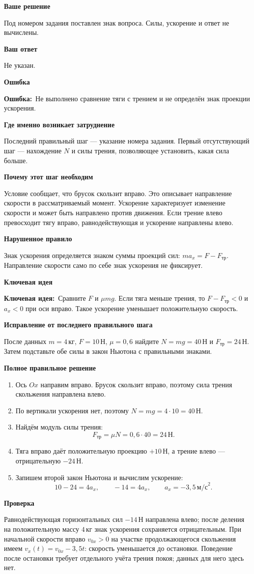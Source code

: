 \documentclass[a4paper,12pt]{article}
\newcommand{\subblock}[1]{\par\medskip\textbf{\color{deepaccent}#1}\par\vspace{-2pt}}
\newcommand{\errorlabel}{\textcolor{errorred}{\textbf{Ошибка:}}}
\newcommand{\keyidea}{\textcolor{ideablue}{\textbf{Ключевая идея:}}}
\begin{document}
\subblock{Ваше решение}
Под номером задания поставлен знак вопроса. Силы, ускорение и ответ не вычислены.

\subblock{Ваш ответ}
Не указан.

\subblock{Ошибка}
\errorlabel\ Не выполнено сравнение тяги с трением и не определён знак проекции ускорения.

\subblock{Где именно возникает затруднение}
Последний правильный шаг --- указание номера задания. Первый отсутствующий шаг --- нахождение $N$ и силы трения, позволяющее установить, какая сила больше.

\subblock{Почему этот шаг необходим}
Условие сообщает, что брусок скользит вправо. Это описывает направление скорости в рассматриваемый момент. Ускорение характеризует изменение скорости и может быть направлено против движения. Если трение влево превосходит тягу вправо, равнодействующая и ускорение направлены влево.

\subblock{Нарушенное правило}
Знак ускорения определяется знаком суммы проекций сил: $ma_x=F-F_{\text{тр}}$. Направление скорости само по себе знак ускорения не фиксирует.

\subblock{Ключевая идея}
\keyidea\ Сравните $F$ и $\mu mg$. Если тяга меньше трения, то $F-F_{\text{тр}}<0$ и $a_x<0$ при оси вправо. Такое ускорение уменьшает положительную скорость.

\subblock{Исправление от последнего правильного шага}
После данных $m=4\,\text{кг}$, $F=10\,\text{Н}$, $\mu=0{,}6$ найдите $N=mg=40\,\text{Н}$ и $F_{\text{тр}}=24\,\text{Н}$. Затем подставьте обе силы в закон Ньютона с правильными знаками.

\subblock{Полное правильное решение}
\begin{enumerate}
\item Ось $Ox$ направим вправо. Брусок скользит вправо, поэтому сила трения скольжения направлена влево.
\item По вертикали ускорения нет, поэтому $N=mg=4\cdot10=40\,\text{Н}$.
\item Найдём модуль силы трения:
\[F_{\text{тр}}=\mu N=0{,}6\cdot40=24\,\text{Н}.\]
\item Тяга вправо даёт положительную проекцию $+10\,\text{Н}$, а трение влево --- отрицательную $-24\,\text{Н}$.
\item Запишем второй закон Ньютона и вычислим ускорение:
\[
10-24=4a_x,\qquad -14=4a_x,\qquad
\boxed{a_x=-3{,}5\,\text{м/с}^2}.
\]
\end{enumerate}

\subblock{Проверка}
Равнодействующая горизонтальных сил $-14\,\text{Н}$ направлена влево; после деления на положительную массу $4\,\text{кг}$ знак ускорения сохраняется отрицательным. При начальной скорости вправо $v_{0x}>0$ на участке продолжающегося скольжения имеем $v_x(t)=v_{0x}-3{,}5t$: скорость уменьшается до остановки. Поведение после остановки требует отдельного учёта трения покоя; данных для него здесь нет.
\end{document}
